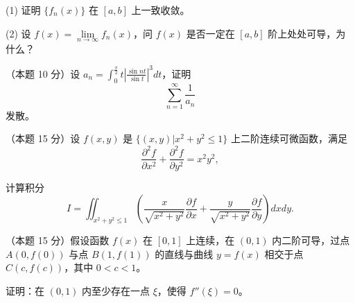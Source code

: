 \documentclass[loose]{ExBook}
\begin{document}
\begin{qitems}
\begin{bbox}
        (1) 证明 \(\{ f_n(x) \}\) 在 \([a, b]\) 上一致收敛。
        
        (2) 设 \( f(x) = \lim\limits_{n \to \infty} f_n(x) \)，问 \( f(x) \) 是否一定在 \([a, b]\) 阶上处处可导，为什么？
    \end{bbox}

        \begin{bbox}
        \qitem（本题 10 分）设 \( a_n = \displaystyle\int_0^{\frac{\pi}{2}} t \left| \frac{\sin nt}{\sin t} \right|^3 dt \)，证明 \[ \sum_{n=1}^{\infty} \frac{1}{a_n} \] 发散。
    \end{bbox}

    \begin{bbox}
        \qitem（本题 15 分）设 \( f(x,y) \) 是 \(\{(x,y) | x^2 + y^2 \leq 1\}\) 上二阶连续可微函数，满足 \[ \frac{\partial^2 f}{\partial x^2} + \frac{\partial^2 f}{\partial y^2} = x^2 y^2, \]

        计算积分 \[ I = \iint_{x^2 + y^2 \leq 1} \left( \frac{x}{\sqrt{x^2 + y^2}} \frac{\partial f}{\partial x} + \frac{y}{\sqrt{x^2 + y^2}} \frac{\partial f}{\partial y} \right) dxdy. \]
    \end{bbox}

    \begin{bbox}
        \qitem（本题 15 分）假设函数 \( f(x) \) 在 \([0,1]\) 上连续，在 \((0,1)\) 内二阶可导，过点 \( A(0,f(0)) \) 与点 \( B(1,f(1)) \) 的直线与曲线 \( y = f(x) \) 相交于点 \( C(c,f(c)) \)，其中 \( 0 < c < 1 \)。

        证明：在 \((0,1)\) 内至少存在一点 \(\xi\)，使得 \( f''(\xi) = 0 \)。
    \end{bbox}
\end{qitems}
\end{document}
